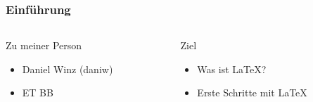 \begin{frame}
    \frametitle{Einführung}
    \begin{columns}
        \begin{column}{0.50\textwidth}
            \begin{block}{Zu meiner Person}
                \begin{itemize}
                    \item Daniel Winz (daniw)
                    \item ET BB
                \end{itemize}
            \end{block}
        \end{column}
        \pause
        \begin{column}{0.50\textwidth}
            \begin{block}{Ziel}
                \begin{itemize}
                    \item Was ist \LaTeX?
                    \item Erste Schritte mit \LaTeX
                \end{itemize}
            \end{block}
        \end{column}
    \end{columns}
\end{frame}

